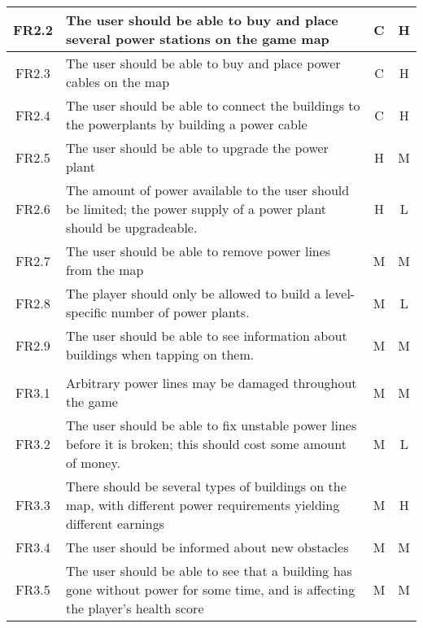 \begin{longtable}{| c | p{8cm} | c | c |}
   	FR2.2 & The user should be able to buy and place several power stations on the game map & C & H \\ \hline

   	FR2.3 & The user should be able to buy and place power cables on the map & C & H \\ \hline

   	FR2.4 & The user should be able to connect the buildings to the powerplants by building a power cable & C & H \\ \hline

   	FR2.5 & The user should be able to upgrade the power plant & H & M \\ \hline

	FR2.6 & The amount of power available to the user should be limited; the power supply of a power plant should be upgradeable. & H & L \\ \hline

	FR2.7 & The user should be able to remove power lines from the map & M & M \\ \hline

	FR2.8 & The player should only be allowed to build a level-specific number of power plants. & M & L \\ \hline

	FR2.9 & The user should be able to see information about buildings when tapping on them. & M & M \\ \hline

\pagebreak

   	\rowcolor{Gray}
   	\multicolumn{4}{| l |}{3) Obstacles} \\ \hline

   	FR3.1 & Arbitrary power lines may be damaged throughout the game & M & M \\ \hline

   	FR3.2 & The user should be able to fix unstable power lines before it is broken; this should cost some amount of money. & M & L \\ \hline

   	FR3.3 & There should be several types of buildings on the map, with different power requirements yielding different earnings & M & H \\ \hline

   	FR3.4 & The user should be informed about new obstacles & M & M \\ \hline

   	FR3.5 & The user should be able to see that a building has gone without power for some time, and is affecting the player's health score & M & M \\ \hline


\end{longtable}

